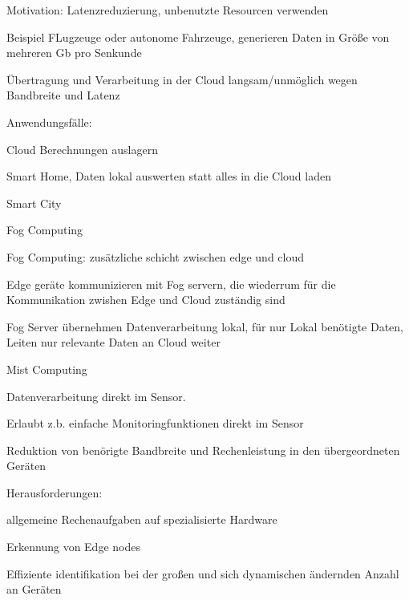 \begin{notes}
\begin{notes}
\begin{notes}
            \item Motivation: Latenzreduzierung, unbenutzte Resourcen verwenden
            \item Beispiel FLugzeuge oder autonome Fahrzeuge, generieren Daten in Größe von mehreren Gb pro Senkunde
            \item Übertragung und Verarbeitung in der Cloud langsam/unmöglich wegen Bandbreite und Latenz
            \item Anwendungsfälle:
            \begin{notes}
                \item Cloud Berechnungen auslagern
                \item Smart Home, Daten lokal auswerten statt alles in die Cloud laden
                \item Smart City
            \end{notes}
        \end{notes}
        \item Fog Computing
        \begin{notes} 
            \item Fog Computing: zusätzliche schicht zwischen edge und cloud
            \item Edge geräte kommunizieren mit Fog servern, die wiederrum für die Kommunikation zwishen Edge und Cloud zuständig sind
            \item Fog Server übernehmen Datenverarbeitung lokal, für nur Lokal benötigte Daten, Leiten nur relevante Daten an Cloud weiter
        \end{notes}
        \item Mist Computing
        \begin{notes} 
            \item Datenverarbeitung direkt im Sensor.
            \item Erlaubt z.b. einfache Monitoringfunktionen direkt im Sensor
            \item Reduktion von benörigte Bandbreite und Rechenleistung in den übergeordneten Geräten
        \end{notes}
        \item Herausforderungen:
        \begin{notes}
            \item allgemeine Rechenaufgaben auf spezialisierte Hardware
            \item Erkennung von Edge nodes
            \item Effiziente identifikation bei der großen und sich dynamischen ändernden Anzahl an Geräten

\end{notes}
\end{notes}
\end{notes}
